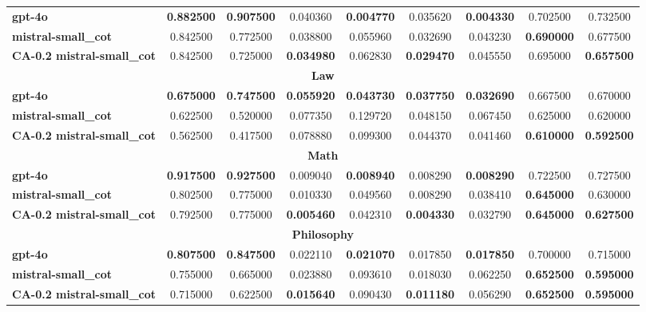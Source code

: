 {\begin{longtable}{|l|cc|cc|cc|cc|}
\hline
\multicolumn{1}{|l|}{\textbf{gpt-4o}} & \textbf{0.882500} & \textbf{0.907500} & 0.040360 & \textbf{0.004770} & 0.035620 & \textbf{0.004330} & 0.702500 & 0.732500 \\
\multicolumn{1}{|l|}{\textbf{mistral-small\_cot}} & 0.842500 & 0.772500 & 0.038800 & 0.055960 & 0.032690 & 0.043230 & \textbf{0.690000} & 0.677500 \\
\multicolumn{1}{|l|}{\textbf{CA-0.2 mistral-small\_cot}} & 0.842500 & 0.725000 & \textbf{0.034980} & 0.062830 & \textbf{0.029470} & 0.045550 & 0.695000 & \textbf{0.657500} \\
\hline
\multicolumn{9}{|c|}{\textbf{Law}} \\
\hline
\multicolumn{1}{|l|}{\textbf{gpt-4o}} & \textbf{0.675000} & \textbf{0.747500} & \textbf{0.055920} & \textbf{0.043730} & \textbf{0.037750} & \textbf{0.032690} & 0.667500 & 0.670000 \\
\multicolumn{1}{|l|}{\textbf{mistral-small\_cot}} & 0.622500 & 0.520000 & 0.077350 & 0.129720 & 0.048150 & 0.067450 & 0.625000 & 0.620000 \\
\multicolumn{1}{|l|}{\textbf{CA-0.2 mistral-small\_cot}} & 0.562500 & 0.417500 & 0.078880 & 0.099300 & 0.044370 & 0.041460 & \textbf{0.610000} & \textbf{0.592500} \\
\hline
\multicolumn{9}{|c|}{\textbf{Math}} \\
\hline
\multicolumn{1}{|l|}{\textbf{gpt-4o}} & \textbf{0.917500} & \textbf{0.927500} & 0.009040 & \textbf{0.008940} & 0.008290 & \textbf{0.008290} & 0.722500 & 0.727500 \\
\multicolumn{1}{|l|}{\textbf{mistral-small\_cot}} & 0.802500 & 0.775000 & 0.010330 & 0.049560 & 0.008290 & 0.038410 & \textbf{0.645000} & 0.630000 \\
\multicolumn{1}{|l|}{\textbf{CA-0.2 mistral-small\_cot}} & 0.792500 & 0.775000 & \textbf{0.005460} & 0.042310 & \textbf{0.004330} & 0.032790 & \textbf{0.645000} & \textbf{0.627500} \\
\hline
\multicolumn{9}{|c|}{\textbf{Philosophy}} \\
\hline
\multicolumn{1}{|l|}{\textbf{gpt-4o}} & \textbf{0.807500} & \textbf{0.847500} & 0.022110 & \textbf{0.021070} & 0.017850 & \textbf{0.017850} & 0.700000 & 0.715000 \\
\multicolumn{1}{|l|}{\textbf{mistral-small\_cot}} & 0.755000 & 0.665000 & 0.023880 & 0.093610 & 0.018030 & 0.062250 & \textbf{0.652500} & \textbf{0.595000} \\
\multicolumn{1}{|l|}{\textbf{CA-0.2 mistral-small\_cot}} & 0.715000 & 0.622500 & \textbf{0.015640} & 0.090430 & \textbf{0.011180} & 0.056290 & \textbf{0.652500} & \textbf{0.595000} \\

\end{longtable}}
